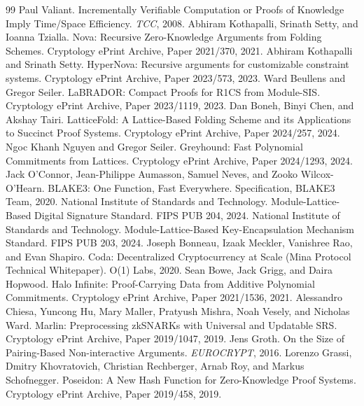 \documentclass[11pt,a4paper]{article}
\begin{document}
\begin{thebibliography}{99}
 Paul Valiant. Incrementally Verifiable Computation or Proofs of Knowledge Imply Time/Space Efficiency. \emph{TCC}, 2008.
 Abhiram Kothapalli, Srinath Setty, and Ioanna Tzialla. Nova: Recursive Zero-Knowledge Arguments from Folding Schemes. Cryptology ePrint Archive, Paper 2021/370, 2021.
 Abhiram Kothapalli and Srinath Setty. HyperNova: Recursive arguments for customizable constraint systems. Cryptology ePrint Archive, Paper 2023/573, 2023.
 Ward Beullens and Gregor Seiler. LaBRADOR: Compact Proofs for R1CS from Module-SIS. Cryptology ePrint Archive, Paper 2023/1119, 2023.
 Dan Boneh, Binyi Chen, and Akshay Tairi. LatticeFold: A Lattice-Based Folding Scheme and its Applications to Succinct Proof Systems. Cryptology ePrint Archive, Paper 2024/257, 2024.
 Ngoc Khanh Nguyen and Gregor Seiler. Greyhound: Fast Polynomial Commitments from Lattices. Cryptology ePrint Archive, Paper 2024/1293, 2024.
 Jack O'Connor, Jean-Philippe Aumasson, Samuel Neves, and Zooko Wilcox-O'Hearn. BLAKE3: One Function, Fast Everywhere. Specification, BLAKE3 Team, 2020.
 National Institute of Standards and Technology. Module-Lattice-Based Digital Signature Standard. FIPS PUB 204, 2024.
 National Institute of Standards and Technology. Module-Lattice-Based Key-Encapsulation Mechanism Standard. FIPS PUB 203, 2024.
 Joseph Bonneau, Izaak Meckler, Vanishree Rao, and Evan Shapiro. Coda: Decentralized Cryptocurrency at Scale (Mina Protocol Technical Whitepaper). O(1) Labs, 2020.
 Sean Bowe, Jack Grigg, and Daira Hopwood. Halo Infinite: Proof-Carrying Data from Additive Polynomial Commitments. Cryptology ePrint Archive, Paper 2021/1536, 2021.
 Alessandro Chiesa, Yuncong Hu, Mary Maller, Pratyush Mishra, Noah Vesely, and Nicholas Ward. Marlin: Preprocessing zkSNARKs with Universal and Updatable SRS. Cryptology ePrint Archive, Paper 2019/1047, 2019.
 Jens Groth. On the Size of Pairing-Based Non-interactive Arguments. \emph{EUROCRYPT}, 2016.
 Lorenzo Grassi, Dmitry Khovratovich, Christian Rechberger, Arnab Roy, and Markus Schofnegger. Poseidon: A New Hash Function for Zero-Knowledge Proof Systems. Cryptology ePrint Archive, Paper 2019/458, 2019.

\end{thebibliography}
\end{document}
